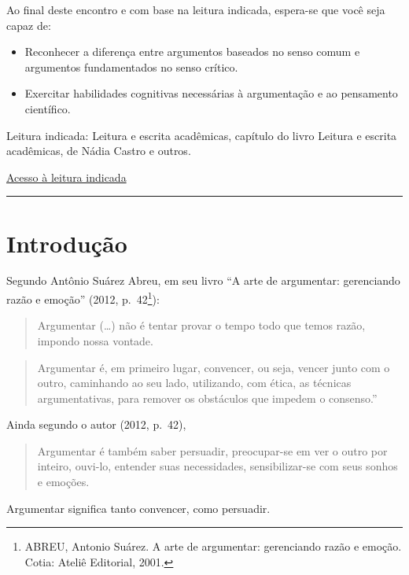 \documentclass[
  letterpaper,
  DIV=11,
  numbers=noendperiod]{scrreprt}
\begin{document}
Ao final deste encontro e com base na leitura indicada, espera-se que
você seja capaz de:

\begin{itemize}
\item
  Reconhecer a diferença entre argumentos baseados no senso comum e
  argumentos fundamentados no senso crítico.
\item
  Exercitar habilidades cognitivas necessárias à argumentação e ao
  pensamento científico.
\end{itemize}

Leitura indicada: Leitura e escrita acadêmicas, capítulo do livro
Leitura e escrita acadêmicas, de Nádia Castro e outros.

\href{vbk://9788533500228/page/11}{Acesso à leitura indicada}

\begin{center}\rule{0.5\linewidth}{0.5pt}\end{center}

\section{Introdução}\label{introduuxe7uxe3o-1}

Segundo Antônio Suárez Abreu, em seu livro ``A arte de argumentar:
gerenciando razão e emoção'' (2012, p.~42\footnote{ABREU, Antonio
  Suárez. A arte de argumentar: gerenciando razão e emoção. Cotia:
  Ateliê Editorial, 2001.}):

\begin{quote}
Argumentar (\ldots) não é tentar provar o tempo todo que temos razão,
impondo nossa vontade.
\end{quote}

\begin{quote}
Argumentar é, em primeiro lugar, convencer, ou seja, vencer junto com o
outro, caminhando ao seu lado, utilizando, com ética, as técnicas
argumentativas, para remover os obstáculos que impedem o consenso.''
\end{quote}

Ainda segundo o autor (2012, p.~42),

\begin{quote}
Argumentar é também saber persuadir, preocupar-se em ver o outro por
inteiro, ouvi-lo, entender suas necessidades, sensibilizar-se com seus
sonhos e emoções.
\end{quote}

Argumentar significa tanto convencer, como persuadir.
\end{document}
